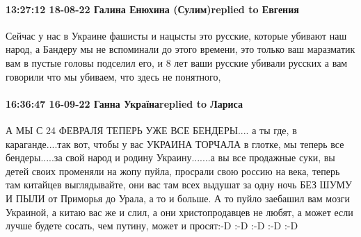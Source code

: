  
 
 
 
 

\paragraph{13:27:12 18-08-22 Галина Енюхина (Сулим)replied to Евгения}

Сейчас у нас в Украине фашисты и нацысты это русские, которые убивают наш
народ, а Бандеру мы не вспоминали до этого времени, это только ваш маразматик
вам в пустые головы подселил его, и 8 лет ваши русские убивали русских а вам
говорили что мы убиваем, что здесь не понятного,

\paragraph{16:36:47 16-09-22 Ганна Українаreplied to Лариса}

А МЫ С 24 ФЕВРАЛЯ ТЕПЕРЬ УЖЕ ВСЕ БЕНДЕРЫ.... а ты где, в караганде....так вот,
чтобы у вас УКРАИНА ТОРЧАЛА в глотке, мы теперь все бендеры.....за свой народ и
родину Украину.......а вы все продажные суки, вы детей своих променяли на жопу
пуйла, просрали свою россию на века, теперь там китайцев выглядывайте, они вас
там всех выдушат за одну ночь БЕЗ ШУМУ И ПЫЛИ от Приморья до Урала, а то и
больше. А то пуйло заебашил вам мозги Украиной, а китаю вас же и слил, а они
христопродавцев не любят, а может если лучше будете сосать, чем путину, может и
просят:-D :-D :-D :-D :-D
